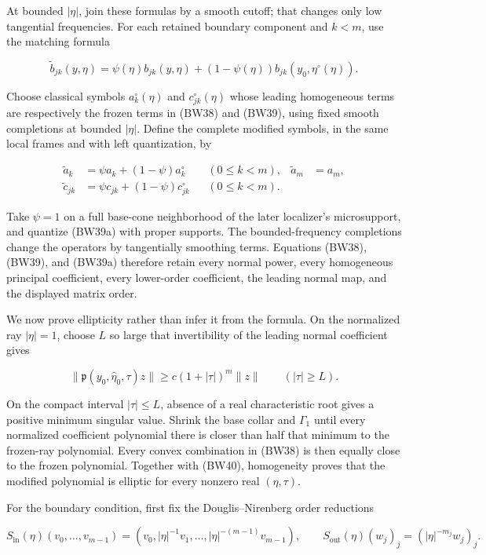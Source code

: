 \documentclass[
  11pt,
]{article}
\begin{document}
At bounded \(|\eta|\), join these formulas by a smooth cutoff; that
changes only low tangential frequencies. For each retained boundary
component and \(k<m\), use the matching formula

\[
 \widetilde b_{jk}(y,\eta)
 =\psi(\eta)b_{jk}(y,\eta)
 +(1-\psi(\eta))b_{jk}(y_0,\eta^\circ(\eta)).
 \tag{BW39}
\]

Choose classical symbols \(a_k^\circ(\eta)\) and \(c_{jk}^\circ(\eta)\)
whose leading homogeneous terms are respectively the frozen terms in
(BW38) and (BW39), using fixed smooth completions at bounded \(|\eta|\).
Define the complete modified symbols, in the same local frames and with
left quantization, by

\[
 \begin{aligned}
 \widetilde a_k
   &=\psi a_k+(1-\psi)a_k^\circ &&(0\leq k<m),
   &\widetilde a_m&=a_m,\\
 \widetilde c_{jk}
   &=\psi c_{jk}+(1-\psi)c_{jk}^\circ &&(0\leq k<m).
 \end{aligned}
 \tag{BW39a}
\]

Take \(\psi=1\) on a full base-cone neighborhood of the later
localizer's microsupport, and quantize (BW39a) with proper supports. The
bounded-frequency completions change the operators by tangentially
smoothing terms. Equations (BW38), (BW39), and (BW39a) therefore retain
every normal power, every homogeneous principal coefficient, every
lower-order coefficient, the leading normal map, and the displayed
matrix order.

We now prove ellipticity rather than infer it from the formula. On the
normalized ray \(|\eta|=1\), choose \(L\) so large that invertibility of
the leading normal coefficient gives

\[
 \|\mathfrak p(y_0,\widehat\eta_0,\tau)z\|
 \geq c(1+|\tau|)^m\|z\|
 \qquad(|\tau|\geq L).
 \tag{BW40}
\]

On the compact interval \(|\tau|\leq L\), absence of a real
characteristic root gives a positive minimum singular value. Shrink the
base collar and \(\Gamma_1\) until every normalized coefficient
polynomial there is closer than half that minimum to the frozen-ray
polynomial. Every convex combination in (BW38) is then equally close to
the frozen polynomial. Together with (BW40), homogeneity proves that the
modified polynomial is elliptic for every nonzero real \((\eta,\tau)\).

For the boundary condition, first fix the Douglis--Nirenberg order
reductions

\[
 S_{\mathrm{in}}(\eta)(v_0,\ldots,v_{m-1})
   =(v_0,|\eta|^{-1}v_1,\ldots,|\eta|^{-(m-1)}v_{m-1}),
 \qquad
 S_{\mathrm{out}}(\eta)(w_j)_j=(|\eta|^{-m_j}w_j)_j.
 \tag{BW40a}
\]
\end{document}
